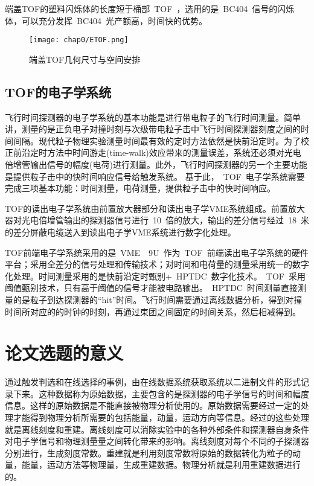 端盖TOF的塑料闪烁体的长度短于桶部~TOF~，选用的是~BC404~信号的闪烁体，可以充分发挥~BC404~光产额高，时间快的优势。
\begin{figure}[!h]
  \centering
  \texttt{[image: chap0/ETOF.png]}
  \caption{端盖TOF几何尺寸与空间安排}
  \label{fig:ETOF}
\end{figure}
\subsection{TOF的电子学系统}
飞行时间探测器的电子学系统的基本功能是进行带电粒子的飞行时间测量。简单讲，测量的是正负电子对撞时刻与次级带电粒子击中飞行时间探测器刻度之间的时间间隔。现代粒子物理实验测量时间最有效的定时方法依然是快前沿定时。为了校正前沿定时方法中时间游走(time-walk)效应带来的测量误差，系统还必须对光电倍增管输出信号的幅度(电荷)进行测量。此外，飞行时间探测器的另一个主要功能是提供粒子击中的快时间响应信号给触发系统。
基于此，~TOF~电子学系统需要完成三项基本功能：时间测量，电荷测量，提供粒子击中的快时间响应。

TOF的读出电子学系统由前置放大器部分和读出电子学VME系统组成。前置放大器对光电倍增管输出的探测器信号进行~10~倍的放大，输出的差分信号经过~18~米的差分屏蔽电缆送入到读出电子学VME系统进行数字化处理。

TOF前端电子学系统采用的是~VME$\quad$9U~作为~TOF~前端读出电子学系统的硬件平台；采用全差分的信号处理和传输技术；对时间和电荷量的测量采用统一的数字化处理。时间测量采用的是快前沿定时甄别+~HPTDC~数字化技术。~TOF~采用阈值甄别技术，只有高于阈值的信号才能被电路输出。~HPTDC~时间测量直接测量的是粒子到达探测器的“hit”时间。飞行时间需要通过离线数据分析，得到对撞时间所对应的的时钟的时刻，再通过束团之间固定的时间关系，然后相减得到。

\section{论文选题的意义}

通过触发判选和在线选择的事例，由在线数据系统获取系统以二进制文件的形式记录下来。这种数据称为原始数据，主要包含的是探测器的电子学信号的时间和幅度信息。这样的原始数据是不能直接被物理分析使用的。原始数据需要经过一定的处理才能得到物理分析所需要的包括能量，动量，运动方向等信息。经过的这些处理就是离线刻度和重建。离线刻度可以消除实验中的各种外部条件和探测器自身条件对电子学信号和物理测量量之间转化带来的影响。离线刻度对每个不同的子探测器分别进行，生成刻度常数。重建就是利用刻度常数将原始的数据转化为粒子的动量，能量，运动方法等物理量，生成重建数据。物理分析就是利用重建数据进行的。~\cite{wangyf2011ww}

